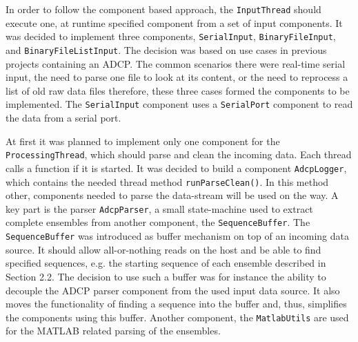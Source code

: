 In order to follow the component based approach, the \texttt{InputThread} should execute one, at runtime specified component from a set of input components. It was decided to implement three components, \texttt{SerialInput}, \texttt{BinaryFileInput}, and \texttt{BinaryFileListInput}. The decision was based on use cases in previous projects containing an ADCP. The common scenarios there were real-time serial input, the need to parse one file to look at its content, or the need to reprocess a list of old raw data files therefore, these three cases formed the components to be implemented. The \texttt{SerialInput} component uses a \texttt{SerialPort} component to read the data from a serial port. 

At first it was planned to implement only one component for the \texttt{ProcessingThread}, which should parse and clean the incoming data. Each thread calls a function if it is started. It was decided to build a component \texttt{AdcpLogger}, which contains the needed thread method \texttt{runParseClean()}. In this method other, components needed to parse the data-stream will be used on the way. A key part is the parser \texttt{AdcpParser}, a small state-machine used to extract complete ensembles from another component, the \texttt{SequenceBuffer}. The \texttt{SequenceBuffer} was introduced as buffer mechanism on top of an incoming data source. It should allow all-or-nothing reads on the host and be able to find specified sequences, e.g. the starting sequence of each ensemble described in Section 2.2. The decision to use such a buffer was for instance the ability to decouple the ADCP parser component from the used input data source. It also moves the functionality of finding a sequence into the buffer and, thus, simplifies the components using this buffer. Another component, the \texttt{MatlabUtils} are used for the MATLAB related parsing of the ensembles.

